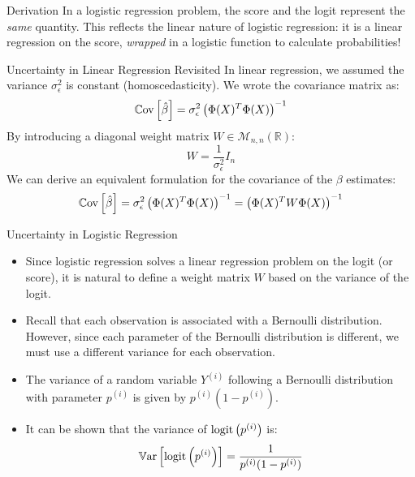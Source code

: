 \begin{frame}{Derivation}
	In a logistic regression problem, the score and the logit represent the \textit{same} quantity. This reflects the linear nature of logistic regression: it is a linear regression on the score, \textit{wrapped} in a logistic function to calculate probabilities!
\end{frame}

\begin{frame}{Uncertainty in Linear Regression Revisited}
	In linear regression, we assumed the variance $\sigma_{\epsilon}^2$ is constant (homoscedasticity). We wrote the covariance matrix as:
	\begin{equation}
		\operatorname{\mathbb{C}ov}\left[\hat{\beta}\right] = \sigma_{\epsilon}^2 \left(\Phi(X)^T \Phi(X)\right)^{-1}
		\nonumber
	\end{equation}
	By introducing a diagonal weight matrix $W \in \mathcal{M}_{n,n}(\mathbb{R})$:
	\begin{equation}
		W = \frac{1}{\sigma_{\epsilon}^2} I_n
		\nonumber
	\end{equation}
	We can derive an equivalent formulation for the covariance of the $\beta$ estimates:
	\begin{equation}
		\operatorname{\mathbb{C}ov}\left[\hat{\beta}\right] = \sigma_{\epsilon}^2 \left(\Phi(X)^T \Phi(X)\right)^{-1} = \left(\Phi(X)^T W \Phi(X)\right)^{-1}
		\nonumber
	\end{equation}	
\end{frame}

\begin{frame}{Uncertainty in Logistic Regression}
	\begin{itemize}
		\item Since logistic regression solves a linear regression problem on the logit (or score), it is natural to define a weight matrix $W$ based on the variance of the logit.
		\pause
		\item Recall that each observation is associated with a Bernoulli distribution. However, since each parameter of the Bernoulli distribution is different, we must use a different variance for each observation.
		\pause
		\item The variance of a random variable $Y^{(i)}$ following a Bernoulli distribution with parameter $p^{(i)}$ is given by $p^{(i)}(1 - p^{(i)})$.
		\pause
		\item It can be shown that the variance of $\operatorname{logit}\left(p^{(i)}\right)$ is: 
		\begin{equation}
			\operatorname{\mathbb{V}ar}\left[\operatorname{logit}\left(p^{(i)}\right)\right] = \frac{1}{p^{(i)}(1 - p^{(i)})}
			\nonumber
		\end{equation}
	\end{itemize}
\end{frame}

